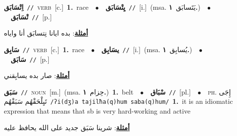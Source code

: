 \documentclass[10pt,a4paper,twoside]{article} %
\begin{document}
\begin{multicols}{2}
{{{{{{{{{\setlength\topsep{0pt}\textbf{\foreignlanguage{arabic}{اِتْسَابَق}}\ {\color{gray}\texttt{//}\color{black}}\ \textsc{verb}\ [c.]\ \textbf{1.}~race\ \ $\bullet$\ \ \setlength\topsep{0pt}\textbf{\foreignlanguage{arabic}{يِتْسَابَق}}\ {\color{gray}\texttt{//}\color{black}}\ [i.]\ \color{gray}(msa. \foreignlanguage{arabic}{يَتَسابَق}~\foreignlanguage{arabic}{\textbf{١.}})\color{black}\ \ $\bullet$\ \ \setlength\topsep{0pt}\textbf{\foreignlanguage{arabic}{تْسَابَق}}\ {\color{gray}\texttt{//}\color{black}}\ [p.]\  \begin{flushright}\color{gray}\foreignlanguage{arabic}{\textbf{\underline{\foreignlanguage{arabic}{أمثلة}}}: بده ايانا نِتسابَق أنا واياه}\end{flushright}\color{black}} \vspace{2mm}

{\setlength\topsep{0pt}\textbf{\foreignlanguage{arabic}{سَابِق}}\ {\color{gray}\texttt{//}\color{black}}\ \textsc{verb}\ [c.]\ \textbf{1.}~race\ \ $\bullet$\ \ \setlength\topsep{0pt}\textbf{\foreignlanguage{arabic}{يسَابِق}}\ {\color{gray}\texttt{//}\color{black}}\ [i.]\ \color{gray}(msa. \foreignlanguage{arabic}{يُسابِق}~\foreignlanguage{arabic}{\textbf{١.}})\color{black}\ \ $\bullet$\ \ \setlength\topsep{0pt}\textbf{\foreignlanguage{arabic}{سَابَق}}\ {\color{gray}\texttt{//}\color{black}}\ [p.]\  \begin{flushright}\color{gray}\foreignlanguage{arabic}{\textbf{\underline{\foreignlanguage{arabic}{أمثلة}}}: صار بده يسابِقني}\end{flushright}\color{black}} \vspace{2mm}

{\setlength\topsep{0pt}\textbf{\foreignlanguage{arabic}{سَبَق}}\ {\color{gray}\texttt{//}\color{black}}\ \textsc{noun}\ [m.]\ \color{gray}(msa. \foreignlanguage{arabic}{حِزام}~\foreignlanguage{arabic}{\textbf{١.}})\color{black}\ \textbf{1.}~belt\ \ $\bullet$\ \ \setlength\topsep{0pt}\textbf{\foreignlanguage{arabic}{سْبَاق}}\ {\color{gray}\texttt{//}\color{black}}\ [pl.]\ \ $\bullet$\ \ \textsc{ph.} \color{gray} \foreignlanguage{arabic}{إِجَى تَيِلْحَقْهُم سَبَقْهُم}\color{black}\ {\color{gray}\texttt{/{\sffamily ʔi(dʒ)a tajilħa(q)hum saba(q)hum}/}\color{black}}\ \textbf{1.}~it is an idiomatic expression that means that sb is very hard-working and active\  \begin{flushright}\color{gray}\foreignlanguage{arabic}{\textbf{\underline{\foreignlanguage{arabic}{أمثلة}}}: شرينا سَبَق جديد على الله يحافظ عليه}\end{flushright}\color{black}} \vspace{2mm}

}}}}}}}}
\end{multicols}
\end{document}
